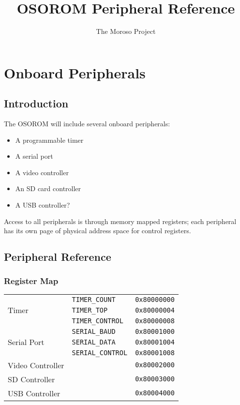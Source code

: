 \documentclass[11pt,openany]{report}
\title{OSOROM Peripheral Reference}
\author{The Moroso Project}
\begin{document}
\maketitle
\tableofcontents

\chapter{Onboard Peripherals}

\section{Introduction}
The OSOROM will include several onboard peripherals:
\begin{itemize}
\item A programmable timer
\item A serial port
\item A video controller
\item An SD card controller
\item A USB controller?
\end{itemize}

Access to all peripherals is through memory mapped registers; each
peripheral has its own page of physical address space for control
registers.

\section{Peripheral Reference}
\subsection{Register Map}

\begin{center}
  \begin{tabular}{|l|l|l|}
    \hline
    \multirow{3}{*}{Timer} & \verb|TIMER_COUNT| & \texttt{0x80000000} \\
                           & \verb|TIMER_TOP| & \texttt{0x80000004} \\
                           & \verb|TIMER_CONTROL| & \texttt{0x80000008} \\
    \hline
    \multirow{3}{*}{Serial Port} & \verb|SERIAL_BAUD| & \texttt{0x80001000} \\
                           & \verb|SERIAL_DATA| & \texttt{0x80001004} \\
                           & \verb|SERIAL_CONTROL| & \texttt{0x80001008} \\
    \hline
    Video Controller & & \texttt{0x80002000} \\
    \hline
    SD Controller & & \texttt{0x80003000} \\
    \hline
    USB Controller & & \texttt{0x80004000} \\
    \hline
  \end{tabular}
\end{center}
\end{document}
